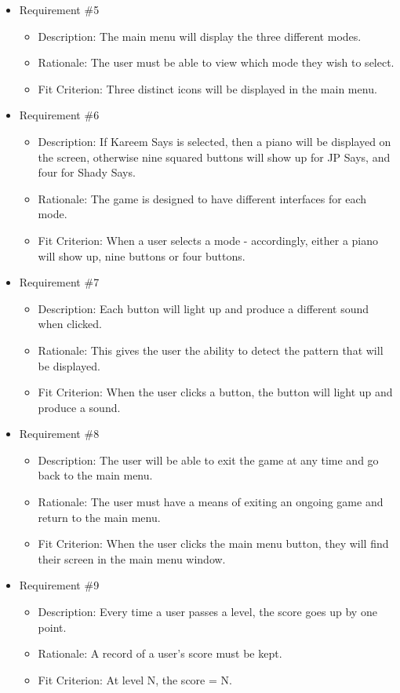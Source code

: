 \documentclass[12pt, titlepage]{article}
\begin{document}
\begin{itemize}
\item Requirement \#5
\begin{itemize}
\item Description: The main menu will display the three different modes. 
\item Rationale: The user must be able to view which mode they wish to select.
\item Fit Criterion: Three distinct icons will be displayed in the main menu.
\end{itemize}

\item Requirement \#6
\begin{itemize}
\item Description: If Kareem Says is selected, then a piano will be displayed on the screen, otherwise nine squared buttons will show up for JP Says, and four for Shady Says.
\item Rationale: The game is designed to have different interfaces for each mode.
\item Fit Criterion: When a user selects a mode - accordingly, either a piano will show up, nine buttons or four buttons. 
\end{itemize}

\item Requirement \#7
\begin{itemize}
\item Description: Each button will light up and produce a different sound when clicked.
\item Rationale: This gives the user the ability to detect the pattern that will be displayed.
\item Fit Criterion: When the user clicks a button, the button will light up and produce a sound.
\end{itemize}

\item Requirement \#8
\begin{itemize}
\item Description: The user will be able to exit the game at any time and go back to the main menu. 
\item Rationale: The user must have a means of exiting an ongoing game and return to the main menu.
\item Fit Criterion: When the user clicks the main menu button, they will find their screen in the main menu window.
\end{itemize}

\item Requirement \#9
\begin{itemize}
\item Description: Every time a user passes a level, the score goes up by one point.
\item Rationale: A record of a user's score must be kept. 
\item Fit Criterion: At level N, the score = N.
\end{itemize}


\end{itemize}
\end{document}
